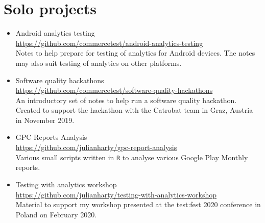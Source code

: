 \section{Solo projects}
\begin{itemize}
    \item Android analytics testing\\ \url{https://github.com/commercetest/android-analytics-testing}\\ Notes to help prepare for testing of analytics for Android devices. The notes may also suit testing of analytics on other platforms.

    \item Software quality hackathons\\ \url{https://github.com/commercetest/software-quality-hackathons}\\ An introductory set of notes to help run a software quality hackathon. Created to support the hackathon with the Catrobat team in Graz, Austria in November 2019. 
    \item GPC Reports Analysis\\ \url{https://github.com/julianharty/gpc-report-analysis}\\ Various small scripts written in \texttt{R} to analyse various Google Play Monthly reports.
    
    \item Testing with analytics workshop\\ \url{https://github.com/julianharty/testing-with-analytics-workshop}\\ Material to support my workshop presented at the test:fest 2020 conference in Poland on  February 2020.
\end{itemize}


